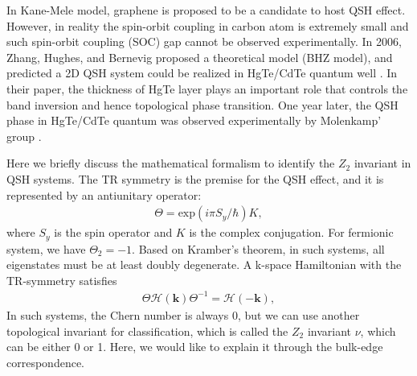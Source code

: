 In Kane-Mele model, graphene is proposed to be a candidate to host QSH effect. However, in reality the spin-orbit coupling in carbon atom is extremely small and such spin-orbit coupling (SOC) gap cannot be observed experimentally. In 2006, Zhang, Hughes, and Bernevig proposed a theoretical model (BHZ model), and predicted a 2D QSH system could be realized in HgTe/CdTe quantum well \cite{bernevig2006quantum_2}. In their paper, the thickness of HgTe layer plays an important role that controls the band inversion and hence topological phase transition. One year later, the QSH phase in HgTe/CdTe quantum was observed experimentally by Molenkamp' group \cite{konig2007quantum}.

Here we briefly discuss the mathematical formalism to identify the $Z_2$ invariant in QSH systems. The TR symmetry is the premise for the QSH effect, and it is represented by an antiunitary operator:
	\begin{equation}
		\label{TRS}
		\begin{aligned}
			\Theta = \textrm{exp}(i\pi S_y/\hbar)K,
		\end{aligned}
	\end{equation}
where $S_y$ is the spin operator and $K$ is the complex conjugation. For fermionic system, we have $\Theta_2 = -1$. Based on Kramber's theorem, in such systems, all eigenstates must be at least doubly degenerate. A k-space Hamiltonian with the TR-symmetry satisfies
	\begin{equation}
		\label{TRS}
		\begin{aligned}
			\Theta\mathcal{H}(\textbf{k})\Theta^{-1} = \mathcal{H}(-\textbf{k}),
		\end{aligned}
	\end{equation}
In such systems, the Chern number is always 0, but we can use another topological invariant for classification, which is called the $Z_2$ invariant $\nu$, which can be either 0 or 1. Here, we would like to explain it through the bulk-edge correspondence.

